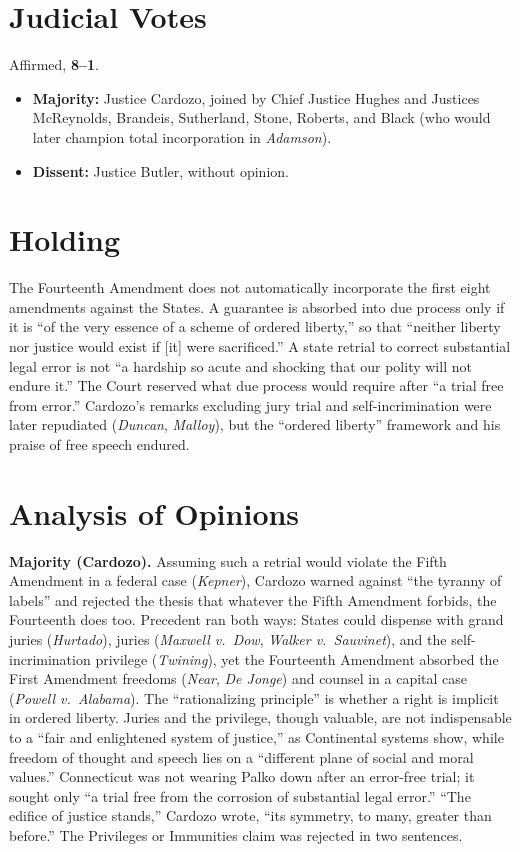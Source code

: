 \documentclass[12pt]{article}
\begin{document}
\section{Judicial Votes}

Affirmed, \textbf{8--1}.
\begin{itemize}
\item \textbf{Majority:} Justice Cardozo, joined by Chief Justice Hughes and Justices McReynolds, Brandeis, Sutherland, Stone, Roberts, and Black (who would later champion total incorporation in \textit{Adamson}).
\item \textbf{Dissent:} Justice Butler, without opinion.
\end{itemize}

\section{Holding}

The Fourteenth Amendment does not automatically incorporate the first eight amendments against the States. A guarantee is absorbed into due process only if it is ``of the very essence of a scheme of ordered liberty,'' so that ``neither liberty nor justice would exist if [it] were sacrificed.'' A state retrial to correct substantial legal error is not ``a hardship so acute and shocking that our polity will not endure it.'' The Court reserved what due process would require after ``a trial free from error.'' Cardozo's remarks excluding jury trial and self-incrimination were later repudiated (\textit{Duncan}, \textit{Malloy}), but the ``ordered liberty'' framework and his praise of free speech endured.

\section{Analysis of Opinions}

\textbf{Majority (Cardozo).} Assuming such a retrial would violate the Fifth Amendment in a federal case (\textit{Kepner}), Cardozo warned against ``the tyranny of labels'' and rejected the thesis that whatever the Fifth Amendment forbids, the Fourteenth does too. Precedent ran both ways: States could dispense with grand juries (\textit{Hurtado}), juries (\textit{Maxwell v.\ Dow}, \textit{Walker v.\ Sauvinet}), and the self-incrimination privilege (\textit{Twining}), yet the Fourteenth Amendment absorbed the First Amendment freedoms (\textit{Near}, \textit{De Jonge}) and counsel in a capital case (\textit{Powell v.\ Alabama}). The ``rationalizing principle'' is whether a right is implicit in ordered liberty. Juries and the privilege, though valuable, are not indispensable to a ``fair and enlightened system of justice,'' as Continental systems show, while freedom of thought and speech lies on a ``different plane of social and moral values.'' Connecticut was not wearing Palko down after an error-free trial; it sought only ``a trial free from the corrosion of substantial legal error.'' ``The edifice of justice stands,'' Cardozo wrote, ``its symmetry, to many, greater than before.'' The Privileges or Immunities claim was rejected in two sentences.
\end{document}

